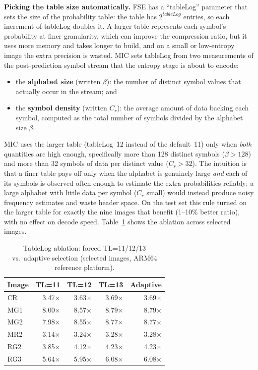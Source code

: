 \documentclass[journal]{IEEEtran}
\begin{document}
\textbf{Picking the table size automatically.} FSE has a ``tableLog''
parameter that sets the size of the probability table: the table has
$2^{\textit{tableLog}}$ entries, so each increment of tableLog doubles it.
A larger table represents each symbol's probability at finer granularity, which
can improve the compression ratio, but it uses more memory and takes longer to
build, and on a small or low-entropy image the extra precision is wasted. MIC
sets tableLog from
two measurements of the post-prediction symbol stream that the entropy stage is
about to encode:
\begin{itemize}
  \item the \textbf{alphabet size} (written $\beta$): the number of distinct
  symbol values that actually occur in the stream; and
  \item the \textbf{symbol density} (written $C_r$): the average amount of data
  backing each symbol, computed as the total number of symbols divided by the
  alphabet size $\beta$.
\end{itemize}
MIC uses the larger table (tableLog~12 instead of the default~11) only when
\emph{both} quantities are high enough, specifically more than 128 distinct
symbols ($\beta > 128$) and more than 32 symbols of data per distinct value
($C_r > 32$). The intuition is that a finer table pays off only when the
alphabet is genuinely large \emph{and} each of its symbols is observed often
enough to estimate the extra probabilities reliably; a large alphabet with
little data per symbol ($C_r$ small) would instead produce noisy frequency
estimates and waste header space. On the test set this rule turned on the
larger table for exactly the nine images that benefit (1--10\% better ratio),
with no effect on decode speed.
Table~\ref{tab:tablelog-ablation} shows the ablation across selected images.

\begin{table}[htbp]
\centering
\caption{TableLog ablation: forced TL=11/12/13 vs.\ adaptive selection
(selected images, ARM64 reference platform).}
\label{tab:tablelog-ablation}
\scriptsize
\begin{tabular}{lrrrr}
\toprule
Image & TL=11 & TL=12 & TL=13 & Adaptive \\
\midrule
CR  & 3.47$\times$ & 3.63$\times$ & 3.69$\times$ & 3.69$\times$ \\
MG1 & 8.00$\times$ & 8.57$\times$ & 8.79$\times$ & 8.79$\times$ \\
MG2 & 7.98$\times$ & 8.55$\times$ & 8.77$\times$ & 8.77$\times$ \\
MR2 & 3.14$\times$ & 3.24$\times$ & 3.28$\times$ & 3.28$\times$ \\
RG2 & 3.85$\times$ & 4.12$\times$ & 4.23$\times$ & 4.23$\times$ \\
RG3 & 5.64$\times$ & 5.95$\times$ & 6.08$\times$ & 6.08$\times$ \\
\bottomrule
\end{tabular}
\end{table}
\end{document}
